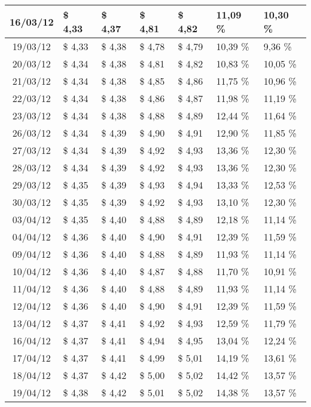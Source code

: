 \begin{center}
\begin{longtable}{|c|p{1.5cm}|p{1.5cm}|p{1.5cm}|p{1.5cm}|p{1.5cm}|p{1.5cm}|}
16/03/12 & \$ 4,33 & \$ 4,37 & \$ 4,81 & \$ 4,82 & 11,09 \% & 10,30 \% \\ \hline
19/03/12 & \$ 4,33 & \$ 4,38 & \$ 4,78 & \$ 4,79 & 10,39 \% & 9,36 \% \\ \hline
20/03/12 & \$ 4,34 & \$ 4,38 & \$ 4,81 & \$ 4,82 & 10,83 \% & 10,05 \% \\ \hline
21/03/12 & \$ 4,34 & \$ 4,38 & \$ 4,85 & \$ 4,86 & 11,75 \% & 10,96 \% \\ \hline
22/03/12 & \$ 4,34 & \$ 4,38 & \$ 4,86 & \$ 4,87 & 11,98 \% & 11,19 \% \\ \hline
23/03/12 & \$ 4,34 & \$ 4,38 & \$ 4,88 & \$ 4,89 & 12,44 \% & 11,64 \% \\ \hline
26/03/12 & \$ 4,34 & \$ 4,39 & \$ 4,90 & \$ 4,91 & 12,90 \% & 11,85 \% \\ \hline
27/03/12 & \$ 4,34 & \$ 4,39 & \$ 4,92 & \$ 4,93 & 13,36 \% & 12,30 \% \\ \hline
28/03/12 & \$ 4,34 & \$ 4,39 & \$ 4,92 & \$ 4,93 & 13,36 \% & 12,30 \% \\ \hline
29/03/12 & \$ 4,35 & \$ 4,39 & \$ 4,93 & \$ 4,94 & 13,33 \% & 12,53 \% \\ \hline
30/03/12 & \$ 4,35 & \$ 4,39 & \$ 4,92 & \$ 4,93 & 13,10 \% & 12,30 \% \\ \hline
03/04/12 & \$ 4,35 & \$ 4,40 & \$ 4,88 & \$ 4,89 & 12,18 \% & 11,14 \% \\ \hline
04/04/12 & \$ 4,36 & \$ 4,40 & \$ 4,90 & \$ 4,91 & 12,39 \% & 11,59 \% \\ \hline
09/04/12 & \$ 4,36 & \$ 4,40 & \$ 4,88 & \$ 4,89 & 11,93 \% & 11,14 \% \\ \hline
10/04/12 & \$ 4,36 & \$ 4,40 & \$ 4,87 & \$ 4,88 & 11,70 \% & 10,91 \% \\ \hline
11/04/12 & \$ 4,36 & \$ 4,40 & \$ 4,88 & \$ 4,89 & 11,93 \% & 11,14 \% \\ \hline
12/04/12 & \$ 4,36 & \$ 4,40 & \$ 4,90 & \$ 4,91 & 12,39 \% & 11,59 \% \\ \hline
13/04/12 & \$ 4,37 & \$ 4,41 & \$ 4,92 & \$ 4,93 & 12,59 \% & 11,79 \% \\ \hline
16/04/12 & \$ 4,37 & \$ 4,41 & \$ 4,94 & \$ 4,95 & 13,04 \% & 12,24 \% \\ \hline
17/04/12 & \$ 4,37 & \$ 4,41 & \$ 4,99 & \$ 5,01 & 14,19 \% & 13,61 \% \\ \hline
18/04/12 & \$ 4,37 & \$ 4,42 & \$ 5,00 & \$ 5,02 & 14,42 \% & 13,57 \% \\ \hline
19/04/12 & \$ 4,38 & \$ 4,42 & \$ 5,01 & \$ 5,02 & 14,38 \% & 13,57 \% \\ \hline

\end{longtable}
\end{center}
